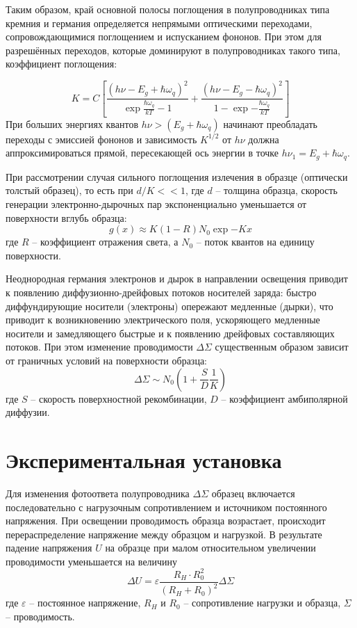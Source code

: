 \documentclass[a4paper,12pt]{article} %
\begin{document}
Таким образом, край основной полосы поглощения в полупроводниках типа кремния и германия определяется непрямыми оптическими переходами, сопровождающимися поглощением и испусканием фононов. При этом для разрешённых переходов, которые доминируют в полупроводниках такого типа, коэффициент поглощения:

\begin{equation}
    K=C\left[\frac{(h\nu-E_g+\hbar\omega_q)^2}{\exp{\frac{\hbar\omega_q}{kT}}-1}+\frac{(h\nu-E_g-\hbar\omega_q)^2}{1-\exp{-\frac{\hbar\omega_q}{kT}}}\right]
\end{equation}
При больших энергиях квантов $h\nu>(E_g+\hbar\omega_q)$ начинают преобладать переходы с эмиссией фононов и зависимость $K^{1/2}$ от $h\nu$ должна аппроксимироваться прямой, пересекающей ось энергии в точке $h\nu_1=E_g+\hbar\omega_q$.

При рассмотрении случая сильного поглощения излечения в образце (оптически толстый образец), то есть при $d/K<<1$, где $d$ -- толщина образца, скорость генерации электронно-дырочных пар экспоненциально уменьшается от поверхности вглубь образца:
\begin{equation}
    g(x)\approx K(1-R)N_0\exp{-Kx}
\end{equation}
где $R$ -- коэффициент отражения света, а $N_0$ -- поток квантов на единицу поверхности.

Неоднородная германия электронов и дырок в направлении освещения приводит к появлению диффузионно-дрейфовых потоков носителей заряда: быстро диффундирующие носители (электроны) опережают медленные (дырки), что приводит к возникновению электрического поля, ускоряющего медленные носители и замедляющего быстрые и к появлению дрейфовых составляющих потоков. При этом изменение проводимости $\Delta\Sigma$ существенным образом зависит от граничных условий на поверхности образца:
\begin{equation}
    \Delta\Sigma\sim N_0\left(1+\frac{S}{D}\frac{1}{K}\right)
\end{equation}
где $S$ -- скорость поверхностной рекомбинации, $D$ -- коэффициент амбиполярной диффузии.



\section{Экспериментальная установка}

Для изменения фотоответа полупроводника $\Delta\Sigma$ образец включается последовательно с нагрузочным сопротивлением и источником постоянного напряжения. При освещении проводимость образца возрастает, происходит перераспределение напряжение между образцом и нагрузкой. В результате падение напряжения $U$ на образце при малом относительном увеличении проводимости уменьшается на величину
    \begin{equation}
        \Delta U=\varepsilon\frac{R_H\cdot R_0^2}{(R_H+R_0)^2}\Delta\Sigma
        \label{eq:deltaU}
    \end{equation}
    где $\varepsilon$ -- постоянное напряжение, $R_H$ и $R_0$ -- сопротивление нагрузки и образца, $\Sigma$ -- проводимость.
\end{document}

